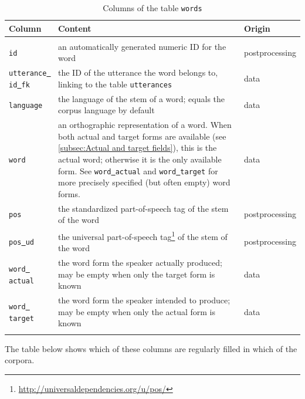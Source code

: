 \documentclass[a4paper, 11pt]{book}
\newcommand{\und}{\underline{{ }}\hspace{0.2mm}}	%
\begin{document}
\begin{longtable}{lp{.5\linewidth}p{.2\linewidth}}
	\toprule
		\textbf{Column} & \textbf{Content} 	& \textbf{Origin} \\
	\midrule
	\endhead
	
	\bottomrule\\[-0.15cm]
	\caption{Columns of the table \texttt{words}}
	\endfoot
	
		\texttt{id} & an automatically generated numeric ID for the word & postprocessing \\
		\texttt{utterance\und id\und fk} & the ID of the utterance the word belongs to, linking to the table \texttt{utterances} & data \\
		\texttt{language}	& the language of the stem of a word; equals the corpus language by default & data \\							  
		\texttt{word}				& an orthographic representation of a word. When both actual and target forms are available 
									  (see \autoref{subsec:Actual and target fields}), this is the actual word; otherwise it is the only available form. 
									  See \texttt{word\und actual} and \texttt{word\und target} for more precisely specified (but often empty) word forms. & data \\
		\texttt{pos}				& the standardized part-of-speech tag of the stem of the word & postprocessing \\
		\texttt{pos\und ud}       &  the universal part-of-speech tag\footnote{\url{http://universaldependencies.org/u/pos/}} of the stem of the word & postprocessing \\
		\texttt{word\und actual}	& the word form the speaker actually produced; may be empty when only the target form is known & data \\
		\texttt{word\und target}	& the word form the speaker intended to produce; may be empty when only the actual form is known & data \\
	\label{tab:Table words}
\end{longtable}

The table below shows which of these columns are regularly filled in which of the corpora. 
\end{document}
